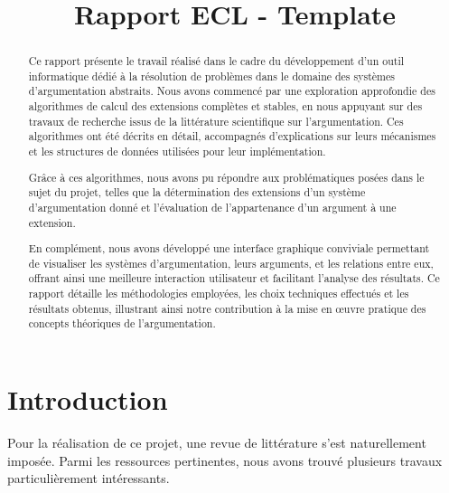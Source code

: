 \documentclass{rapportECL}
\title{Rapport ECL - Template} %
\begin{document}




        
\fairemarges %
\fairepagedegarde %
\tabledematieres %

\begin{abstract}
	Ce rapport présente le travail réalisé dans le cadre du développement d’un outil informatique dédié à la résolution de problèmes 
	dans le domaine des systèmes d’argumentation abstraits. Nous avons commencé par une exploration approfondie des algorithmes de 
	calcul des extensions complètes et stables, en nous appuyant sur des travaux de recherche issus de la littérature scientifique 
	sur l’argumentation. Ces algorithmes ont été décrits en détail, accompagnés d’explications sur leurs mécanismes et les structures 
	de données utilisées pour leur implémentation.

    Grâce à ces algorithmes, nous avons pu répondre aux problématiques posées dans le sujet du projet, telles que la détermination 
	des extensions d’un système d’argumentation donné et l’évaluation de l’appartenance d’un argument à une extension.

    En complément, nous avons développé une interface graphique conviviale permettant de visualiser les systèmes d’argumentation, 
	leurs arguments, et les relations entre eux, offrant ainsi une meilleure interaction utilisateur et facilitant l’analyse des 
	résultats. Ce rapport détaille les méthodologies employées, les choix techniques effectués et les résultats obtenus, illustrant 
	ainsi notre contribution à la mise en œuvre pratique des concepts théoriques de l’argumentation.
\end{abstract}

\newpage %


\section{Introduction} 
Pour la réalisation de ce projet, une revue de littérature s’est naturellement imposée. Parmi les ressources pertinentes, nous avons trouvé plusieurs travaux particulièrement intéressants. 
\end{document}

